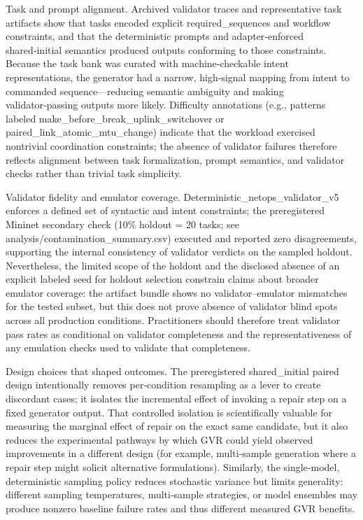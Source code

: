 \documentclass[conference]{IEEEtran}
\begin{document}
Task and prompt alignment. Archived validator traces and representative task artifacts show that tasks encoded explicit required\_sequences and workflow constraints, and that the deterministic prompts and adapter‑enforced shared‑initial semantics produced outputs conforming to those constraints. Because the task bank was curated with machine‑checkable intent representations, the generator had a narrow, high‑signal mapping from intent to commanded sequence---reducing semantic ambiguity and making validator‑passing outputs more likely. Difficulty annotations (e.g., patterns labeled make\_before\_break\_uplink\_switchover or paired\_link\_atomic\_mtu\_change) indicate that the workload exercised nontrivial coordination constraints; the absence of validator failures therefore reflects alignment between task formalization, prompt semantics, and validator checks rather than trivial task simplicity.

Validator fidelity and emulator coverage. Deterministic\_netops\_validator\_v5 enforces a defined set of syntactic and intent constraints; the preregistered Mininet secondary check (10\% holdout = 20 tasks; see analysis/contamination\_summary.csv) executed and reported zero disagreements, supporting the internal consistency of validator verdicts on the sampled holdout. Nevertheless, the limited scope of the holdout and the disclosed absence of an explicit labeled seed for holdout selection constrain claims about broader emulator coverage: the artifact bundle shows no validator--emulator mismatches for the tested subset, but this does not prove absence of validator blind spots across all production conditions. Practitioners should therefore treat validator pass rates as conditional on validator completeness and the representativeness of any emulation checks used to validate that completeness.

Design choices that shaped outcomes. The preregistered shared\_initial paired design intentionally removes per‑condition resampling as a lever to create discordant cases; it isolates the incremental effect of invoking a repair step on a fixed generator output. That controlled isolation is scientifically valuable for measuring the marginal effect of repair on the exact same candidate, but it also reduces the experimental pathways by which GVR could yield observed improvements in a different design (for example, multi‑sample generation where a repair step might solicit alternative formulations). Similarly, the single‑model, deterministic sampling policy reduces stochastic variance but limits generality: different sampling temperatures, multi‑sample strategies, or model ensembles may produce nonzero baseline failure rates and thus different measured GVR benefits.
\end{document}
